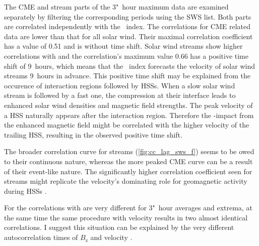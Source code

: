 The CME and stream parts of the 3"~hour maximum data are examined separately by filtering the corresponding periods using the SWS list. Both parts are correlated independently with the \Kp~index. The correlations for CME related data are lower than that for all solar wind. Their maximal correlation coefficient has a value of 0.51 and is without time shift.
Solar wind streams show higher correlations with \Kp{} and the correlation's maximum value 0.66 has a positive time shift of 9~hours, which means that the \Kp~index forecasts the velocity of solar wind streams 9~hours in advance.
This positive time shift may be explained from the occurence of interaction regions followed by HSSs. When a slow solar wind stream is followed by a fast one, the compression at their interface leads to enhanced solar wind densities and magnetic field strengths. The peak velocity of a HSS naturally appears after the interaction region. Therefore the \Kp-impact from the enhanced magnetic field might be correlated with the higher velocity of the trailing HSS, resulting in the observed positive time shift.

The broader correlation curve for streams (\autoref{fig:cc_lag_sws_f}) seems to be owed to their continuous nature, whereas the more peaked CME curve can be a result of their event-like nature. The significantly higher correlation coefficient seen for streams might replicate the velocity's dominating role for geomagnetic activity during HSSs \citep{Holappa2014}.

For \vBz{} the correlations with \Kp{} are very different for 3"~hour averages and extrema, at the same time the same procedure with velocity results in two almost identical correlations. I suggest this situation can be explained by the very different autocorrelation times of $B_\text{z}$ and velocity \citep{Elliott2013}.



